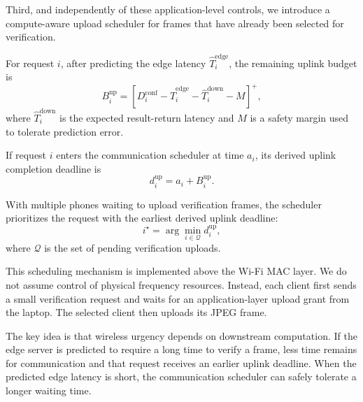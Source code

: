 Third, and independently of these application-level controls, we introduce a
compute-aware upload scheduler for frames that have already been selected for
verification.

For request $i$, after predicting the edge latency
$\hat T_i^{\mathrm{edge}}$, the remaining uplink budget is
\begin{equation}
B_i^{\mathrm{up}}
=
\left[
D_i^{\mathrm{conf}}
-
\hat T_i^{\mathrm{edge}}
-
\hat T_i^{\mathrm{down}}
-
M
\right]^+,
\end{equation}
where $\hat T_i^{\mathrm{down}}$ is the expected result-return latency and
$M$ is a safety margin used to tolerate prediction error.

If request $i$ enters the communication scheduler at time $a_i$, its derived
uplink completion deadline is
\begin{equation}
d_i^{\mathrm{up}}
=
a_i+B_i^{\mathrm{up}}.
\end{equation}

With multiple phones waiting to upload verification frames, the scheduler
prioritizes the request with the earliest derived uplink deadline:
\begin{equation}
i^\star
=
\arg\min_{i\in\mathcal{Q}}
d_i^{\mathrm{up}},
\end{equation}
where $\mathcal{Q}$ is the set of pending verification uploads.

This scheduling mechanism is implemented above the Wi-Fi MAC layer. We do not
assume control of physical frequency resources. Instead, each client first
sends a small verification request and waits for an application-layer upload
grant from the laptop. The selected client then uploads its JPEG frame.

The key idea is that wireless urgency depends on downstream computation. If
the edge server is predicted to require a long time to verify a frame, less
time remains for communication and that request receives an earlier uplink
deadline. When the predicted edge latency is short, the communication
scheduler can safely tolerate a longer waiting time.